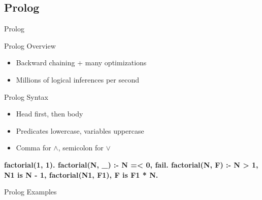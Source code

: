 \documentclass[12pt]{beamer}
\newcommand{\key}[1]{{\color{blue}#1}}
\newcommand{\str}[1]{{\color{green!50!black}#1}}
\newcommand{\defn}[1]{{\color{purple}#1}}
\begin{document}
\subsection{Prolog}
\begin{frame}[fragile]{Prolog}
	\begin{block}{Prolog Overview}
		\begin{itemize}
			\item Backward chaining + many optimizations
			\item Millions of logical inferences per second
		\end{itemize}
	\end{block}
	\pause
	\begin{block}{Prolog Syntax}
		\begin{itemize}
			\item Head first, then body
			\item Predicates lowercase, variables uppercase
			\item Comma for $\land$, semicolon for $\lor$
		\end{itemize}
		\begin{semiverbatim}\bfseries\footnotesize
			\defn{factorial}(1, 1).
			\defn{factorial}(\str{N}, \str{_}) :- \str{N} =< 0, \key{fail}.
			\defn{factorial}(\str{N}, \str{F}) :- \str{N} > 1, \str{N1} \key{is} \str{N} - 1,
			                   factorial(\str{N1}, \str{F1}), \str{F} \key{is} \str{F1} * \str{N}.
		\end{semiverbatim}
	\end{block}
\end{frame}
\begin{frame}
	\begin{center}
		\Huge Prolog Examples
	\end{center}
\end{frame}
\end{document}
